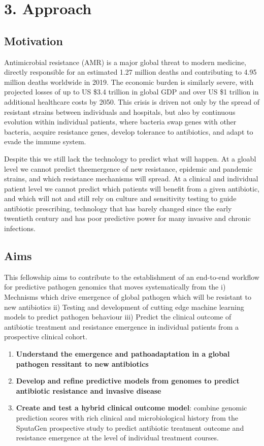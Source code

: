 \section*{3. Approach}
\subsection*{Motivation}
Antimicrobial resistance (AMR) is a major global threat to modern medicine, directly responsible for an estimated 1.27 million deaths and contributing to 4.95 million deaths worldwide in 2019. The economic burden is similarly severe, with projected losses of up to US \$3.4 trillion in global GDP and over US \$1 trillion in additional healthcare costs by 2050. This crisis is driven not only by the spread of resistant strains between individuals and hospitals, but also by continuous evolution within individual patients, where bacteria swap genes with other bacteria, acquire resistance genes, develop tolerance to antibiotics, and adapt to evade the immune system.

Despite this we still lack the technology to predict what will happen.  At a gloabl level we cannot predict theemergence of new resistance, epidemic and pandemic strains, and which resistance mechanisms will spread. At a clinical and individual patient level we cannot predict which patients will benefit from a given antibiotic, and which will not
and still rely on culture and sensitivity testing to guide antibiotic prescribing, technology
that has barely changed since the early twentieth century and has poor predictive power for many invasive and chronic infections.

\subsection*{Aims}
This fellowship aims to contribute to the establishment of an end-to-end workflow 
for predictive pathogen genomics that moves systematically from the 
i) Mechnisms which drive emergence of global pathogen which will be resistant to new antibiotics
ii) Testing and development of cutting edge machine learning models to predict pathogen behaviour 
iii) Predict the clinical outcome of antibiotic treatment and resistance emergence in individual patients from a prospective clinical cohort. 

\begin{enumerate}
  \item \textbf{Understand the emergence and pathoadaptation in a global pathogen ressitant to new antibiotics}
  \item \textbf{Develop and refine predictive models from genomes to predict antibiotic resistance and invasive disease}
  \item \textbf{Create and test a hybrid clinical outcome model}: combine genomic prediction scores with rich clinical and microbiological history from the SputaGen prospective study to predict antibiotic treatment outcome and resistance emergence at the level of individual treatment courses.
\end{enumerate}

